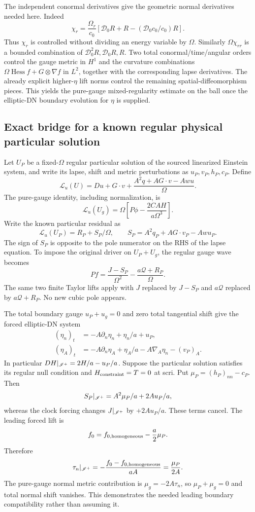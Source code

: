 The independent conormal derivatives give the geometric normal derivatives needed here. Indeed
\[
 \chi_r=\frac{\Omega_r}{c_0}
 \left[\mathcal D_0R+R-(\mathcal D_0c_0/c_0)R\right].
\]
Thus $\chi_r$ is controlled without dividing an energy variable by $\Omega$. Similarly $\Omega\chi_{rr}$ is a bounded combination of $\mathcal D_0^2R,\mathcal D_0R,R$. Two total conormal/time/angular orders control the gauge metric in $H^1$ and the curvature combinations $\Omega\operatorname{Hess}f+G\otimes\nabla f$ in $L^2$, together with the corresponding lapse derivatives. The already explicit higher-$\eta$ lift norms control the remaining spatial-diffeomorphism pieces. This yields the pure-gauge mixed-regularity estimate on the ball once the elliptic-DN boundary evolution for $\eta$ is supplied.

\subsection{Exact bridge for a known regular physical particular solution}
Let $U_P$ be a fixed-$\Omega$ regular particular solution of the sourced linearized Einstein system, and write its lapse, shift and metric perturbations as $u_P,v_P,h_P,c_P$. Define
\[
 \mathcal L_u(U)=Du+G\cdot v+
 \frac{A^2q+AG\cdot v-Awu}{\Omega}.
\]
The pure-gauge identity, including normalization, is
\[
 \mathcal L_u(U_g)=\Omega\left[P\phi-\frac{2CAH}{a\Omega^3}\right].
\]
Write the known particular residual as
\[
 \mathcal L_u(U_P)=R_P+S_P/\Omega,
 \qquad S_P=A^2q_P+AG\cdot v_P-Awu_P.
\]
The sign of $S_P$ is opposite to the pole numerator on the RHS of the lapse equation. To impose the original driver on $U_P+U_g$, the regular gauge wave becomes
\[
 Pf=\frac{J-S_P}{\Omega^2}-\frac{a\mathcal Q+R_P}{\Omega}.
\]
The same two finite Taylor lifts apply with $J$ replaced by $J-S_P$ and $a\mathcal Q$ replaced by $a\mathcal Q+R_P$. No new cubic pole appears.

The total boundary gauge $u_P+u_g=0$ and zero total tangential shift give the forced elliptic-DN system
\begin{align}
 (\eta_n)_t&=-A\partial_n\eta_n+\eta_n/a+u_P,\\
 (\eta_A)_t&=-A\partial_n\eta_A+\eta_A/a-A\nabla_A\eta_n-(v_P)_A.
\end{align}
In particular $DH|_{\mathscr I^+}=2H/a-u_P/a$. Suppose the particular solution satisfies its regular null condition and $H_{\rm constraint}=T=0$ at scri. Put $\mu_P=(h_P)_{nn}-c_P$. Then
\[
 S_P|_{\mathscr I^+}=A^2\mu_P/a+2Au_P/a,
\]
whereas the clock forcing changes $J|_{\mathscr I^+}$ by $+2Au_P/a$. These terms cancel. The leading forced lift is
\[
 f_0=f_{0,\rm homogeneous}-\frac a2\mu_P.
\]
Therefore
\[
 \tau_n|_{\mathscr I^+}=-\frac{f_0-f_{0,\rm homogeneous}}{aA}
 =\frac{\mu_P}{2A}.
\]
The pure-gauge normal metric contribution is $\mu_g=-2A\tau_n$, so $\mu_P+\mu_g=0$ and total normal shift vanishes. This demonstrates the needed leading boundary compatibility rather than assuming it.

